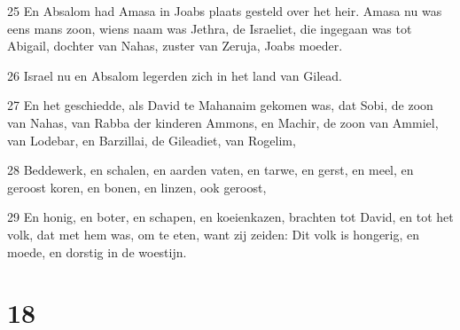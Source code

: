 \par 25 En Absalom had Amasa in Joabs plaats gesteld over het heir. Amasa nu was eens mans zoon, wiens naam was Jethra, de Israeliet, die ingegaan was tot Abigail, dochter van Nahas, zuster van Zeruja, Joabs moeder.
\par 26 Israel nu en Absalom legerden zich in het land van Gilead.
\par 27 En het geschiedde, als David te Mahanaim gekomen was, dat Sobi, de zoon van Nahas, van Rabba der kinderen Ammons, en Machir, de zoon van Ammiel, van Lodebar, en Barzillai, de Gileadiet, van Rogelim,
\par 28 Beddewerk, en schalen, en aarden vaten, en tarwe, en gerst, en meel, en geroost koren, en bonen, en linzen, ook geroost,
\par 29 En honig, en boter, en schapen, en koeienkazen, brachten tot David, en tot het volk, dat met hem was, om te eten, want zij zeiden: Dit volk is hongerig, en moede, en dorstig in de woestijn.

\chapter{18}

